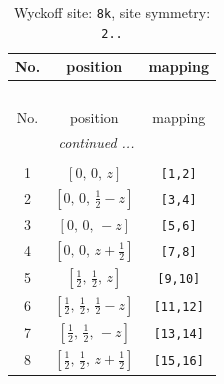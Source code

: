 \documentclass[fleqn,8pt]{jsarticle}
\begin{document}
\begin{longtable}{ccc}
\caption{Wyckoff site: {\tt 8k}, site symmetry: {\tt 2..}}
 \\
 \hline \hline
No. & position & mapping \\ \hline \endfirsthead

\multicolumn{2}{l}{\tablename\ \thetable{}} \\
 \hline \hline
No. & position & mapping \\ \hline \endhead

 \hline \hline
\multicolumn{2}{r}{\footnotesize\it continued ...} \\ \endfoot

 \hline \hline
\multicolumn{2}{r}{} \\ \endlastfoot

1 & $\left[ 0,\, 0,\, z \right]$ & {\tt [1,2]} \\ \hline
2 & $\left[ 0,\, 0,\, \frac{1}{2} - z \right]$ & {\tt [3,4]} \\ \hline
3 & $\left[ 0,\, 0,\, - z \right]$ & {\tt [5,6]} \\ \hline
4 & $\left[ 0,\, 0,\, z + \frac{1}{2} \right]$ & {\tt [7,8]} \\ \hline
5 & $\left[ \frac{1}{2},\, \frac{1}{2},\, z \right]$ & {\tt [9,10]} \\ \hline
6 & $\left[ \frac{1}{2},\, \frac{1}{2},\, \frac{1}{2} - z \right]$ & {\tt [11,12]} \\ \hline
7 & $\left[ \frac{1}{2},\, \frac{1}{2},\, - z \right]$ & {\tt [13,14]} \\ \hline
8 & $\left[ \frac{1}{2},\, \frac{1}{2},\, z + \frac{1}{2} \right]$ & {\tt [15,16]} \\
\end{longtable}
\renewcommand{\arraystretch}{1.2}
\end{document}
